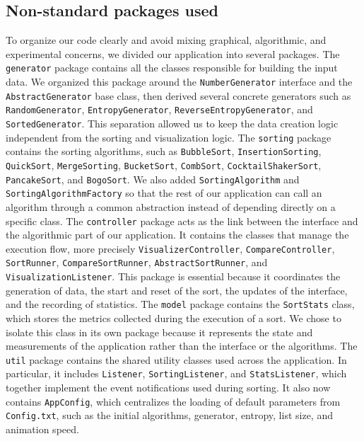 \documentclass{article}
\begin{document}
\subsection{Non-standard packages used}
To organize our code clearly and avoid mixing graphical, algorithmic, and 
experimental concerns, we divided our application into several packages. 
The \texttt{generator} package contains all the classes responsible for building the 
input data. We organized this package around the \texttt{NumberGenerator} 
interface and the \texttt{AbstractGenerator} base class, then derived several 
concrete generators such as \texttt{RandomGenerator}, \texttt{EntropyGenerator},
\texttt{ReverseEntropyGenerator}, and \texttt{SortedGenerator}. This separation 
allowed us to keep the data creation logic independent from the sorting and 
visualization logic.
The \texttt{sorting} package contains the sorting algorithms, such as 
\texttt{BubbleSort}, \texttt{InsertionSorting}, \texttt{QuickSort}, \texttt{MergeSorting}, \texttt{BucketSort}, \texttt{CombSort}, \texttt{CocktailShakerSort}, \texttt{PancakeSort}, and \texttt{BogoSort}. We also 
added \texttt{SortingAlgorithm} and \texttt{SortingAlgorithmFactory} so that the 
rest of our application can call an algorithm through a common abstraction instead 
of depending directly on a specific class.
The \texttt{controller} package acts as the link between the interface and the 
algorithmic part of our application. It contains the classes that manage the 
execution flow, more precisely \texttt{VisualizerController}, \texttt{CompareController}, \texttt{SortRunner}, \texttt{CompareSortRunner}, \texttt{AbstractSortRunner}, and \texttt{VisualizationListener}. This package is 
essential because it coordinates the generation of data, the start and reset of the 
sort, the updates of the interface, and the recording of statistics.
The \texttt{model} package contains the \texttt{SortStats} class, which stores the 
metrics collected during the execution of a sort. We chose to isolate this class in its 
own package because it represents the state and measurements of the application 
rather than the interface or the algorithms.
The \texttt{util} package contains the shared utility classes used across the 
application. In particular, it includes \texttt{Listener}, \texttt{SortingListener}, and \texttt{StatsListener}, which together implement the event notifications used during
sorting. It also now contains \texttt{AppConfig}, which centralizes the loading of 
default parameters from \texttt{Config.txt}, such as the initial algorithms, 
generator, entropy, list size, and animation speed.
\end{document}
